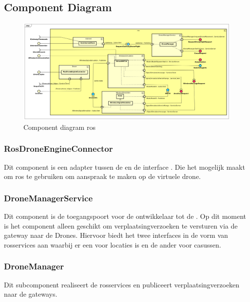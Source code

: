 \documentclass[a4paper, 11pt, oneside]{report}
\begin{document}
\subsection{Component Diagram}
\label{DetailedDesign:ros:ComponentDiagram}
\begin{figure}[H]
	\begin{center}\includegraphics[width=\linewidth]{Afbeeldingen/rosComponentDiagram.png}\end{center}
	\caption{Component diagram ros}
	\label{fig:component:ros}
\end{figure}

\subsubsection{RosDroneEngineConnector}
\label{architectural:subcomponenten:RosDroneEngineConnector}
Dit component is een adapter tussen de  en de interface . Die het mogelijk maakt om ros te gebruiken om aanspraak te maken op de virtuele drone.

\subsubsection{DroneManagerService}
\label{architectural:subcomponenten:DroneManagerService}
Dit component is de toegangspoort voor de ontwikkelaar tot de .
Op dit moment is het component alleen geschikt om verplaatsingverzoeken te versturen via de gateway naar de Drones.
Hiervoor biedt het twee interfaces in de vorm van rosservices aan waarbij er een voor locaties is en de ander voor casussen. 

\subsubsection{DroneManager}
\label{architectural:subcomponenten:DroneManager}
Dit subcomponent realiseert de rosservices en publiceert verplaatsingverzoeken naar de gateways.  
\end{document}
